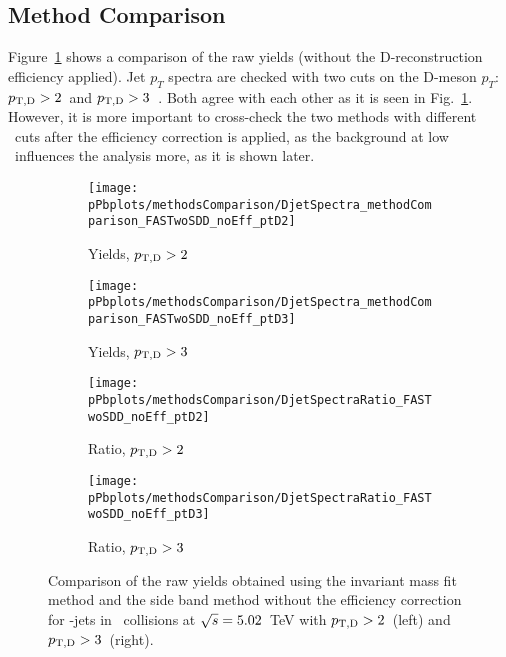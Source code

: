 \subsection{Method Comparison}

Figure~\ref{fig:pPbCompDirectJetSB_beforeEff} shows a comparison of the raw yields (without the D-reconstruction efficiency applied). 
Jet $p_T$ spectra are checked with two cuts on the D-meson $p_{T}$: $p_{\mathrm{T,D}}>2$~\GeVc and $p_{\mathrm{T,D}}>3$~\GeVc. Both agree with each other as it is seen in Fig.~\ref{fig:pPbCompDirectJetSB_beforeEff}. 
However, it is more important to cross-check the two methods with different \ptd\ cuts after the efficiency correction is applied, 
as the background at low \ptd\ influences the analysis more, as it is shown later.

\begin{figure}[bth]
\centering
\begin{subfigure}[b]{0.45\textwidth}
\texttt{[image: pPbplots/methodsComparison/DjetSpectra\_methodComparison\_FASTwoSDD\_noEff\_ptD2]}
\caption{Yields, $p_{\mathrm{T,D}}>2$~\GeVc}
\end{subfigure}
\begin{subfigure}[b]{0.45\textwidth}
\texttt{[image: pPbplots/methodsComparison/DjetSpectra\_methodComparison\_FASTwoSDD\_noEff\_ptD3]}
\caption{Yields, $p_{\mathrm{T,D}}>3$~\GeVc}
\end{subfigure}
\begin{subfigure}[c]{0.45\textwidth}
\texttt{[image: pPbplots/methodsComparison/DjetSpectraRatio\_FASTwoSDD\_noEff\_ptD2]}
\caption{Ratio, $p_{\mathrm{T,D}}>2$~\GeVc}
\end{subfigure}
\begin{subfigure}[d]{0.45\textwidth}
\texttt{[image: pPbplots/methodsComparison/DjetSpectraRatio\_FASTwoSDD\_noEff\_ptD3]}
\caption{Ratio, $p_{\mathrm{T,D}}>3$~\GeVc}
\end{subfigure}
\caption{Comparison of the raw yields obtained using the invariant mass fit method and the side band method without the efficiency correction for \Dstar-jets in \pPb\ collisions at $\sqrt{s}=5.02$~TeV with $p_{\mathrm{T,D}}>2$~\GeVc (left) and $p_{\mathrm{T,D}}>3$~\GeVc (right).}
\label{fig:pPbCompDirectJetSB_beforeEff}
\end{figure}



